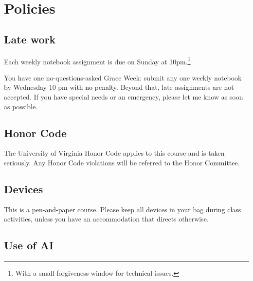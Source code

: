 \documentclass[oneside,11pt]{amsart}
\begin{document}
\section{Policies}

\subsection{Late work}
Each weekly notebook assignment is due on Sunday at 10pm.\footnote{With a small forgiveness window for technical issues.}

You have one no-questions-asked Grace Week: submit any one weekly notebook by Wednesday 10 pm with no penalty. Beyond that,
late assignments are not accepted.
If you have special needs or an emergency, please let me know as soon as possible.

\subsection{Honor Code}
The University of Virginia Honor Code applies to this course and is taken seriously. Any Honor Code violations will be referred to the Honor Committee.

\subsection{Devices}

This is a pen-and-paper course. Please keep all devices in your bag during class activities, unless you have an accommodation that directs otherwise.

\subsection{Use of AI}
\end{document}
